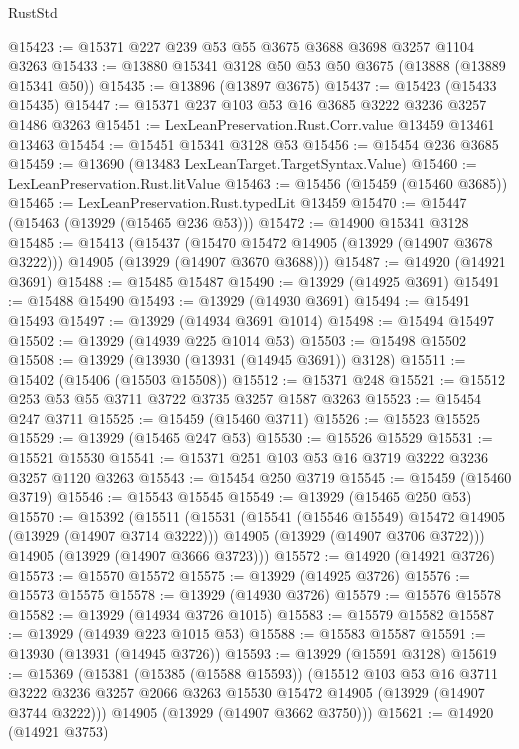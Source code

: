 \begin{lexlean}{RustStd}
\begin{coremodule}
{\begin{coremodule}
{{{{{{{{{{{{{{{{{{{{{{{{{{{{{{{{{{{{{@15423 := @15371 @227 @239 @53 @55 @3675 @3688 @3698 @3257 @1104 @3263
@15433 := @13880 @15341 @3128 @50 @53 @50 @3675 (@13888 (@13889 @15341 @50))
@15435 := @13896 (@13897 @3675)
@15437 := @15423 (@15433 @15435)
@15447 := @15371 @237 @103 @53 @16 @3685 @3222 @3236 @3257 @1486 @3263
@15451 := LexLeanPreservation.Rust.Corr.value @13459 @13461 @13463
@15454 := @15451 @15341 @3128 @53
@15456 := @15454 @236 @3685
@15459 := @13690 (@13483 LexLeanTarget.TargetSyntax.Value)
@15460 := LexLeanPreservation.Rust.litValue
@15463 := @15456 (@15459 (@15460 @3685))
@15465 := LexLeanPreservation.Rust.typedLit @13459
@15470 := @15447 (@15463 (@13929 (@15465 @236 @53)))
@15472 := @14900 @15341 @3128
@15485 := @15413
    (@15437
      (@15470 @15472 @14905 (@13929 (@14907 @3678 @3222)))
      @14905
      (@13929 (@14907 @3670 @3688)))
@15487 := @14920 (@14921 @3691)
@15488 := @15485 @15487
@15490 := @13929 (@14925 @3691)
@15491 := @15488 @15490
@15493 := @13929 (@14930 @3691)
@15494 := @15491 @15493
@15497 := @13929 (@14934 @3691 @1014)
@15498 := @15494 @15497
@15502 := @13929 (@14939 @225 @1014 @53)
@15503 := @15498 @15502
@15508 := @13929 (@13930 (@13931 (@14945 @3691)) @3128)
@15511 := @15402 (@15406 (@15503 @15508))
@15512 := @15371 @248
@15521 := @15512 @253 @53 @55 @3711 @3722 @3735 @3257 @1587 @3263
@15523 := @15454 @247 @3711
@15525 := @15459 (@15460 @3711)
@15526 := @15523 @15525
@15529 := @13929 (@15465 @247 @53)
@15530 := @15526 @15529
@15531 := @15521 @15530
@15541 := @15371 @251 @103 @53 @16 @3719 @3222 @3236 @3257 @1120 @3263
@15543 := @15454 @250 @3719
@15545 := @15459 (@15460 @3719)
@15546 := @15543 @15545
@15549 := @13929 (@15465 @250 @53)
@15570 := @15392
    (@15511
      (@15531
        (@15541 (@15546 @15549) @15472 @14905 (@13929 (@14907 @3714 @3222)))
        @14905
        (@13929 (@14907 @3706 @3722)))
      @14905
      (@13929 (@14907 @3666 @3723)))
@15572 := @14920 (@14921 @3726)
@15573 := @15570 @15572
@15575 := @13929 (@14925 @3726)
@15576 := @15573 @15575
@15578 := @13929 (@14930 @3726)
@15579 := @15576 @15578
@15582 := @13929 (@14934 @3726 @1015)
@15583 := @15579 @15582
@15587 := @13929 (@14939 @223 @1015 @53)
@15588 := @15583 @15587
@15591 := @13930 (@13931 (@14945 @3726))
@15593 := @13929 (@15591 @3128)
@15619 := @15369
    (@15381
      (@15385 (@15588 @15593))
      (@15512
        @103
        @53
        @16
        @3711
        @3222
        @3236
        @3257
        @2066
        @3263
        @15530
        @15472
        @14905
        (@13929 (@14907 @3744 @3222)))
      @14905
      (@13929 (@14907 @3662 @3750)))
@15621 := @14920 (@14921 @3753)
}}}}}}}}}}}}}}}}}}}}}}}}}}}}}}}}}}}}}
\end{coremodule}}
\end{coremodule}
\end{lexlean}
